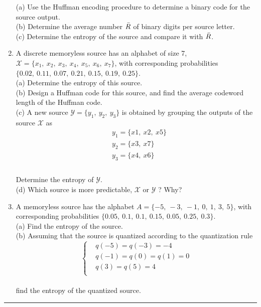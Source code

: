 \documentclass[a4paper,12pt]{article}
\begin{document}
\begin{enumerate}
            (a) Use the Huffman encoding procedure to determine a binary code for the source output. \\ 
            (b) Determine the average number $\Bar{R}$ of binary digits per source letter. \\ 
            (c) Determine the entropy of the source and compare it with $\Bar{R}$. \\ 
        \item 
            A discrete memoryless source has an alphabet of size 7, $\mathcal{X} = \{ x_1, \ x_2, \ x_3, \ x_4, \ x_5, \ x_6, \ x_7 \}$, with corresponding probabilities $\{ 0.02, \ 0.11, \ 0.07, \ 0.21, \ 0.15, \ 0.19, \ 0.25 \}$. \\
            (a) Determine the entropy of this source. \\ 
            (b) Design a Huffman code for this source, and find the average codeword length of the Huffman code. \\ 
            (c) A new source $\mathcal{Y} = \{ y_1, \ y_2, \ y_3 \}$ is obtained by grouping the outputs of the source $\mathcal{X}$ as 
            $$ 
            \begin{aligned}
                & y_1 = \{ x1, \ x2, \ x5 \} \\
                & y_2 = \{ x3, \ x7 \} \\ 
                & y_3 = \{ x4, \ x6 \} \\
            \end{aligned}
            $$ \\
            Determine the entropy of $\mathcal{Y}$. \\
            (d) Which source is more predictable, $\mathcal{X}$ or $\mathcal{Y}$ ? Why? \\ 
        \item 
            A memoryless source has the alphabet $A = \{-5, \ -3, \ -1, \ 0, \ 1, \ 3, \ 5 \}$, with corresponding probabilities $\{ 0.05, \ 0.1, \ 0.1, \ 0.15, \ 0.05, \ 0.25, \ 0.3 \}$. \\ 
            (a) Find the entropy of the source. \\ 
            (b) Assuming that the source is quantized according to the quantization rule
            $$\left\{ 
            \begin{aligned}
                & q(-5) = q(-3) = -4 \\
                & q(-1) = q(0) = q(1) = 0 \\ 
                & q(3) = q(5) = 4 \\
            \end{aligned}
            \right.
            $$ \\
            find the entropy of the quantized source.
    \end{enumerate}
    \rule{\textwidth}{0.4pt}
\end{document}
